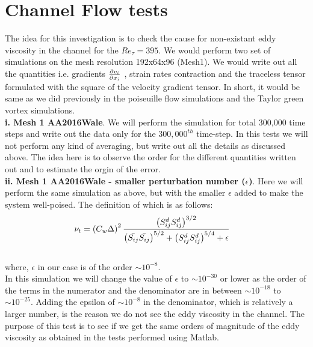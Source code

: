 \newpage
\section{Channel Flow tests}

The idea for this investigation is to check the cause for non-existant eddy viscosity in the channel for the ${Re_{\tau}} = 395$.
We would perform two set of simulations on the mesh resolution 192x64x96 (Mesh1). We would write out all the quantities i.e. gradients $\frac{\partial v_i}{\partial x_i}$ , strain rates contraction and the traceless tensor formulated with the square of the velocity gradient tensor. In short, it would be same as we did previously in the poiseuille flow simulations and the Taylor green vortex simulations. \\

{\bf i. Mesh 1 AA2016Wale}. We will perform the simulation for total 300,000 time steps and write out the data only for the $300,000^{th}$ time-step. In this tests we will not perform any kind of averaging, but write out all the details as discussed above. The idea here is to observe the order for the different quantities written out and to estimate the orgin of the error.\\

{\bf ii. Mesh 1 AA2016Wale -  smaller perturbation number ($\epsilon$)}. Here we will perform the same simulation as above, but with the smaller $\epsilon$ added to make the system well-poised.
The definition of which is as follows:\\
%
\begin{equation}
\label{eddy-viscosity}
\begin{split}
{\nu_t} &= \left({C_w}{\Delta}\right)^{2}
\frac{\left({S_{ij}^{d}}{S_{ij}^{d}}\right)^{3/2}}{\left(\bar{S_{ij}} \bar{S_{ij}}\right)^{5/2} + {\left({S_{ij}^{d}}{S_{ij}^{d}}\right)^{5/4}} + \epsilon}
\end{split}
\end{equation}
%
\\
where, $\epsilon$ in our case is of the order $\sim 10^{-8}$.\\

In this simulation we will change the value of $\epsilon$ to $\sim 10^{-30}$ or lower as the order of the terms in the numerator and the denominator are in between $\sim 10^{-18}$ to $\sim 10^{-25}$. Adding the epsilon of $\sim 10^{-8}$ in the denominator, which is relatively a larger number, is the reason we do not see the eddy viscosity in the channel. The purpose of this test is to see if we get the same orders of magnitude of the eddy viscosity as obtained in the tests performed using Matlab.
